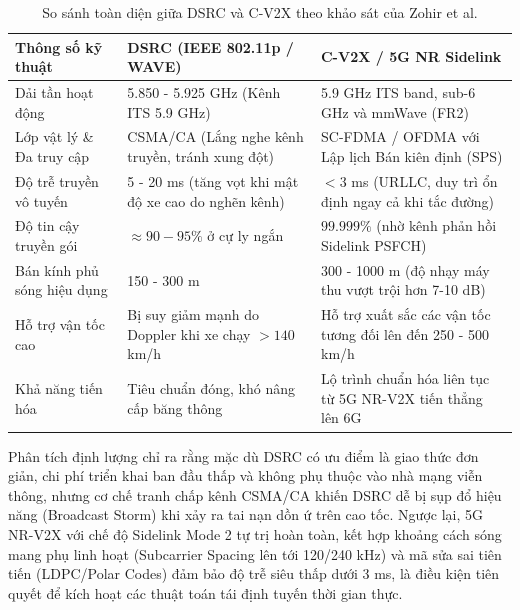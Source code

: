 \documentclass[a4paper]{article}
\begin{document}
\begin{table}[H]
    \centering
    \small
    \begin{tabularx}{\textwidth}{|p{3.2cm}|X|X|}
        \hline
        \textbf{Thông số kỹ thuật} & \textbf{DSRC (IEEE 802.11p / WAVE)} & \textbf{C-V2X / 5G NR Sidelink} \\
        \hline
        Dải tần hoạt động & 5.850 - 5.925 GHz (Kênh ITS 5.9 GHz) & 5.9 GHz ITS band, sub-6 GHz và mmWave (FR2) \\
        \hline
        Lớp vật lý \& Đa truy cập & CSMA/CA (Lắng nghe kênh truyền, tránh xung đột) & SC-FDMA / OFDMA với Lập lịch Bán kiên định (SPS) \\
        \hline
        Độ trễ truyền vô tuyến & 5 - 20 ms (tăng vọt khi mật độ xe cao do nghẽn kênh) & $< 3$ ms (URLLC, duy trì ổn định ngay cả khi tắc đường) \\
        \hline
        Độ tin cậy truyền gói & $\approx 90 - 95\%$ ở cự ly ngắn & $99.999\%$ (nhờ kênh phản hồi Sidelink PSFCH) \\
        \hline
        Bán kính phủ sóng hiệu dụng & 150 - 300 m & 300 - 1000 m (độ nhạy máy thu vượt trội hơn 7-10 dB) \\
        \hline
        Hỗ trợ vận tốc cao & Bị suy giảm mạnh do Doppler khi xe chạy $> 140$ km/h & Hỗ trợ xuất sắc các vận tốc tương đối lên đến 250 - 500 km/h \\
        \hline
        Khả năng tiến hóa & Tiêu chuẩn đóng, khó nâng cấp băng thông & Lộ trình chuẩn hóa liên tục từ 5G NR-V2X tiến thẳng lên 6G \\
        \hline
    \end{tabularx}
    \caption{So sánh toàn diện giữa DSRC và C-V2X theo khảo sát của Zohir et al.}
    \label{tab:dsrc_cv2x_comparison}
\end{table}

Phân tích định lượng chỉ ra rằng mặc dù DSRC có ưu điểm là giao thức đơn giản, chi phí triển khai ban đầu thấp và không phụ thuộc vào nhà mạng viễn thông, nhưng cơ chế tranh chấp kênh CSMA/CA khiến DSRC dễ bị sụp đổ hiệu năng (Broadcast Storm) khi xảy ra tai nạn dồn ứ trên cao tốc. Ngược lại, 5G NR-V2X với chế độ Sidelink Mode 2 tự trị hoàn toàn, kết hợp khoảng cách sóng mang phụ linh hoạt (Subcarrier Spacing lên tới 120/240 kHz) và mã sửa sai tiên tiến (LDPC/Polar Codes) đảm bảo độ trễ siêu thấp dưới 3 ms, là điều kiện tiên quyết để kích hoạt các thuật toán tái định tuyến thời gian thực.
\end{document}
